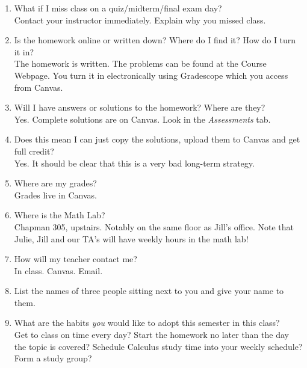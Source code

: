 \documentclass[11pt,fleqn]{article}
\begin{document}
\begin{enumerate}
\item What if I miss class on a quiz/midterm/final exam day?\\
Contact your instructor immediately. Explain why you missed class. 
\vfill

\item Is the homework online or written down? Where do I find it? How do I turn it in?\\
The homework is written. The problems can be found at the Course Webpage. You turn it in electronically using Gradescope which you access from Canvas.
\vfill
\item Will I have answers or solutions to the homework? Where are they?\\
Yes. Complete solutions are on Canvas. Look in the \emph{Assessments} tab.
\vfill
\item Does this mean I can just copy the solutions, upload them to Canvas and get full credit? \\
Yes. 
It should be clear that this is a very bad long-term strategy. 
\vfill
\item Where are my grades?\\
Grades live in Canvas.
\vfill

\item Where is the Math Lab?\\
Chapman 305, upstairs. Notably on the same floor as Jill's office. Note that Julie, Jill and our TA's will have weekly hours in the math lab!
\vfill
\item How will my teacher contact me? \\
In class. Canvas. Email.
\vfill
\item List the names of three people sitting next to you and give your name to them.
\vfill
\item What are the habits \emph{you} would like to adopt this semester in this class?\\
Get to class on time every day? Start the homework no later than the day the topic is covered? Schedule Calculus study time into your weekly schedule? Form a study group?
\end{enumerate}
\end{document}
